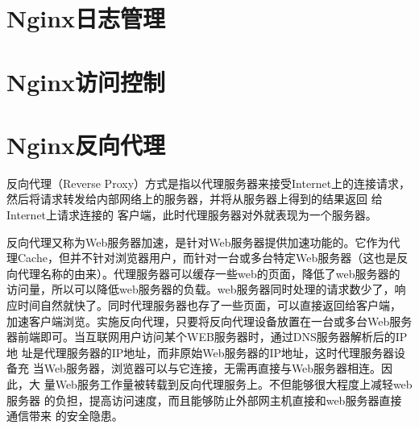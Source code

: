 \section{Nginx日志管理}

\section{Nginx访问控制}

\section{Nginx反向代理}
\label{subsec:NginxReverseProxy}

反向代理（Reverse Proxy）方式是指以代理服务器来接受Internet上的连接请求，
然后将请求转发给内部网络上的服务器，并将从服务器上得到的结果返回
给Internet上请求连接的 客户端，此时代理服务器对外就表现为一个服务器。

反向代理又称为Web服务器加速，是针对Web服务器提供加速功能的。它作为代
理Cache，但并不针对浏览器用户，而针对一台或多台特定Web服务器（这也是反
向代理名称的由来）。代理服务器可以缓存一些web的页面，降低了web服务器的
访问量，所以可以降低web服务器的负载。web服务器同时处理的请求数少了，响
应时间自然就快了。同时代理服务器也存了一些页面，可以直接返回给客户端，
加速客户端浏览。实施反向代理，只要将反向代理设备放置在一台或多台Web服务
器前端即可。当互联网用户访问某个WEB服务器时，通过DNS服务器解析后的IP地
址是代理服务器的IP地址，而非原始Web服务器的IP地址，这时代理服务器设备充
当Web服务器，浏览器可以与它连接，无需再直接与Web服务器相连。因此，大
量Web服务工作量被转载到反向代理服务上。不但能够很大程度上减轻web服务器
的负担，提高访问速度，而且能够防止外部网主机直接和web服务器直接通信带来
的安全隐患。

